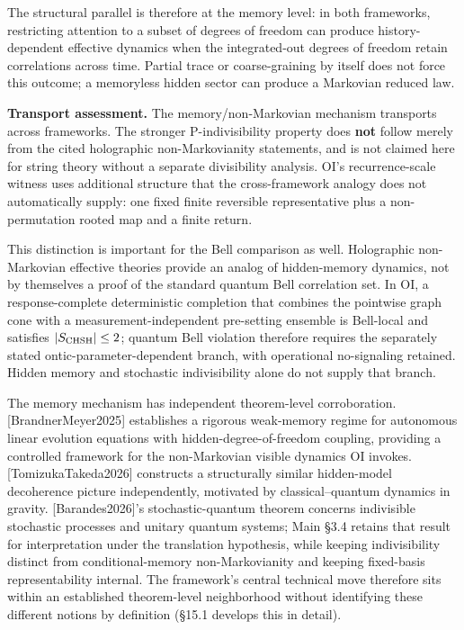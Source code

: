 \documentclass[
]{article}
\begin{document}
The structural parallel is therefore at the memory level: in both
frameworks, restricting attention to a subset of degrees of freedom can
produce history-dependent effective dynamics when the integrated-out
degrees of freedom retain correlations across time. Partial trace or
coarse-graining by itself does not force this outcome; a memoryless
hidden sector can produce a Markovian reduced law.

\textbf{Transport assessment.} The memory/non-Markovian mechanism
transports across frameworks. The stronger P-indivisibility property
does \textbf{not} follow merely from the cited holographic
non-Markovianity statements, and is not claimed here for string theory
without a separate divisibility analysis. OI's recurrence-scale witness
uses additional structure that the cross-framework analogy does not
automatically supply: one fixed finite reversible representative plus a
non-permutation rooted map and a finite return.

This distinction is important for the Bell comparison as well.
Holographic non-Markovian effective theories provide an analog of
hidden-memory dynamics, not by themselves a proof of the standard
quantum Bell correlation set. In OI, a response-complete deterministic
completion that combines the pointwise graph cone with a
measurement-independent pre-setting ensemble is Bell-local and satisfies
\(|S_{\rm CHSH}|\le2\); quantum Bell violation therefore requires the
separately stated ontic-parameter-dependent branch, with operational
no-signaling retained. Hidden memory and stochastic indivisibility alone
do not supply that branch.

The memory mechanism has independent theorem-level corroboration.
{[}BrandnerMeyer2025{]} establishes a rigorous weak-memory regime for
autonomous linear evolution equations with hidden-degree-of-freedom
coupling, providing a controlled framework for the non-Markovian visible
dynamics OI invokes. {[}TomizukaTakeda2026{]} constructs a structurally
similar hidden-model decoherence picture independently, motivated by
classical--quantum dynamics in gravity. {[}Barandes2026{]}'s
stochastic-quantum theorem concerns indivisible stochastic processes and
unitary quantum systems; Main §3.4 retains that result for
interpretation under the translation hypothesis, while keeping
indivisibility distinct from conditional-memory non-Markovianity and
keeping fixed-basis representability internal. The framework's central
technical move therefore sits within an established theorem-level
neighborhood without identifying these different notions by definition
(§15.1 develops this in detail).
\end{document}
